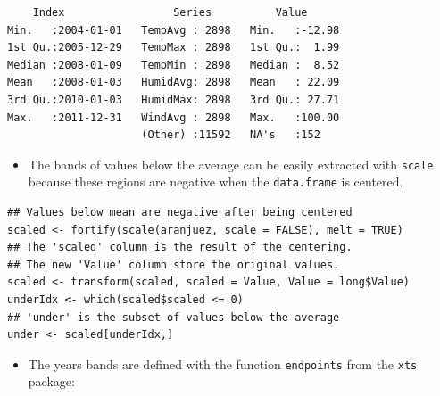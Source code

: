 \documentclass[smallroyalvopaper]{memoir}
\begin{document}
\begin{verbatim}
    Index                 Series          Value       
Min.   :2004-01-01   TempAvg : 2898   Min.   :-12.98  
1st Qu.:2005-12-29   TempMax : 2898   1st Qu.:  1.99  
Median :2008-01-09   TempMin : 2898   Median :  8.52  
Mean   :2008-01-03   HumidAvg: 2898   Mean   : 22.09  
3rd Qu.:2010-01-03   HumidMax: 2898   3rd Qu.: 27.71  
Max.   :2011-12-31   WindAvg : 2898   Max.   :100.00  
                     (Other) :11592   NA's   :152
\end{verbatim}

\begin{itemize}
\item The bands of values below the average can be easily extracted with
\texttt{scale} because these regions are negative when the \texttt{data.frame} is
centered.
\end{itemize}


\lstset{language=r,label= ,caption= ,captionpos=b,numbers=none}
\begin{lstlisting}
## Values below mean are negative after being centered
scaled <- fortify(scale(aranjuez, scale = FALSE), melt = TRUE)
## The 'scaled' column is the result of the centering.
## The new 'Value' column store the original values.
scaled <- transform(scaled, scaled = Value, Value = long$Value)
underIdx <- which(scaled$scaled <= 0)
## 'under' is the subset of values below the average
under <- scaled[underIdx,]
\end{lstlisting}

\begin{itemize}
\item The years bands are defined with the function \texttt{endpoints} from the
\texttt{xts} package:
\end{itemize}

\end{document}
